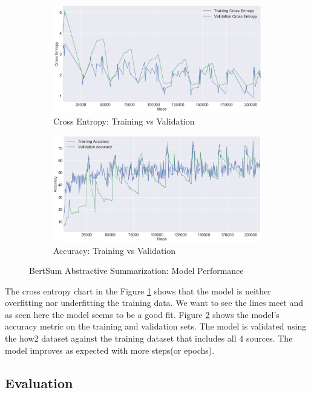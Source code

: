 \documentclass{article}
\begin{document}
\begin{figure}[H]
\begin{subfigure}{.5\textwidth}
  \centering
  \includegraphics[width=\linewidth]{xent.png}
  \caption{Cross Entropy: Training vs Validation}
  \label{fig:xent}
\end{subfigure}%
\begin{subfigure}{.5\textwidth}
  \centering
  \includegraphics[width=\linewidth]{accuracy.png}
  \caption{Accuracy: Training vs Validation}
  \label{fig:accuracy}
\end{subfigure}
\caption{BertSum Abstractive Summarization: Model Performance}
\label{fig:modelperf}
\end{figure}

The cross entropy chart  in the Figure \ref{fig:xent} shows that the model is neither overfitting nor underfitting the training data. We want to see the lines meet and as seen here the model seems to be a good fit. Figure \ref{fig:accuracy} shows the model’s accuracy metric on the training and validation sets. The model is validated using the how2 dataset against the training dataset that includes all 4 sources. The model improves as expected with more steps(or epochs). 

\subsection{Evaluation}
\end{document}
